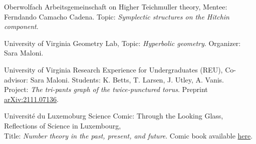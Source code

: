 {Oberwolfach}
{Arbeitsgemeinschaft on Higher Teichmuller theory,}
{Mentee: Ferndando Camacho Cadena. Topic: \emph{Symplectic structures on the Hitchin component}.}

{University of Virginia}
{Geometry Lab,}
{Topic: \emph{Hyperbolic geometry}. Organizer: Sara Maloni.}

{University of Virginia}
{Research Experience for Undergraduates (REU),}
{Co-advisor: Sara Maloni. Students: K. Betts, T. Larsen, J. Utley, A. Vanis. \\Project: \emph{The tri-pants graph of the twice-punctured torus}. Preprint \href{https://arxiv.org/abs/2111.07136}{arXiv:2111.07136}.}

{Universit{\'e} du Luxemoburg}
{Science Comic: Through the Looking Glass, Reflections of Science}
{\vspace{-0.3em}
{\normalsize in Luxembourg,} \\
Title: \emph{Number theory in the past, present, and future}. Comic book available \href{https://www.yumpu.com/en/document/view/62710549/science-comic-through-the-looking-glass-reflections-of-science-in-luxembourg}{here}.}
